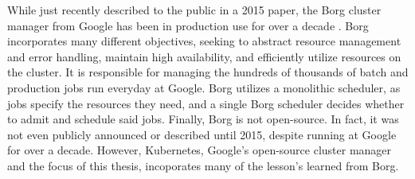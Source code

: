 While just recently described to the public in a 2015 paper, the
Borg cluster manager from Google has been in production use for over a
decade \cite{borg}. Borg incorporates
many different objectives, seeking to abstract resource management and error
handling, maintain high availability, and efficiently utilize resources on the
cluster. It is responsible for managing the hundreds of
thousands of batch and production jobs run everyday at Google.
Borg utilizes a monolithic scheduler, as jobs specify the
resources they need, and a single Borg scheduler decides whether to admit and
schedule said jobs. Finally, Borg is not open-source. In fact, it was not even
publicly announced or described until 2015, despite running at Google for over a
decade. However, Kubernetes, Google's open-source cluster manager and the focus
of this thesis, incoporates many of the lesson's learned from Borg.

